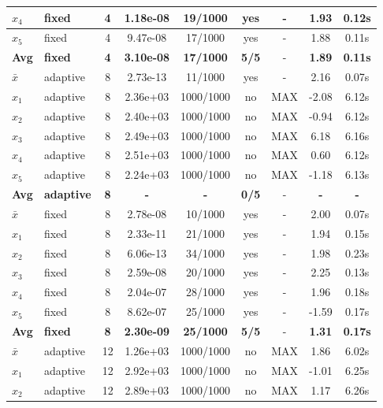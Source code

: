 \begin{longtable}{|l|l|c|c|c|c|c|c|c|}
\hline
$x_4$ & fixed & 4 & 1.18e-08 & 19/1000 & yes & - & 1.93 & 0.12s \\
\hline
$x_5$ & fixed & 4 & 9.47e-08 & 17/1000 & yes & - & 1.88 & 0.11s \\
\hline
\hline\hline
\textbf{Avg} & \textbf{fixed} & \textbf{4} & \textbf{3.10e-08} & \textbf{17/1000} & \textbf{5/5} & - & \textbf{1.89} & \textbf{0.11s} \\
\hline\hline
$\bar{x}$ & adaptive & 8 & 2.73e-13 & 11/1000 & yes & - & 2.16 & 0.07s \\
\hline
$x_1$ & adaptive & 8 & 2.36e+03 & 1000/1000 & no & MAX & -2.08 & 6.12s \\
\hline
$x_2$ & adaptive & 8 & 2.40e+03 & 1000/1000 & no & MAX & -0.94 & 6.12s \\
\hline
$x_3$ & adaptive & 8 & 2.49e+03 & 1000/1000 & no & MAX & 6.18 & 6.16s \\
\hline
$x_4$ & adaptive & 8 & 2.51e+03 & 1000/1000 & no & MAX & 0.60 & 6.12s \\
\hline
$x_5$ & adaptive & 8 & 2.24e+03 & 1000/1000 & no & MAX & -1.18 & 6.13s \\
\hline
\hline\hline
\textbf{Avg} & \textbf{adaptive} & \textbf{8} & \textbf{-} & \textbf{-} & \textbf{0/5} & - & \textbf{-} & \textbf{-} \\
\hline\hline
\hline
$\bar{x}$ & fixed & 8 & 2.78e-08 & 10/1000 & yes & - & 2.00 & 0.07s \\
\hline
$x_1$ & fixed & 8 & 2.33e-11 & 21/1000 & yes & - & 1.94 & 0.15s \\
\hline
$x_2$ & fixed & 8 & 6.06e-13 & 34/1000 & yes & - & 1.98 & 0.23s \\
\hline
$x_3$ & fixed & 8 & 2.59e-08 & 20/1000 & yes & - & 2.25 & 0.13s \\
\hline
$x_4$ & fixed & 8 & 2.04e-07 & 28/1000 & yes & - & 1.96 & 0.18s \\
\hline
$x_5$ & fixed & 8 & 8.62e-07 & 25/1000 & yes & - & -1.59 & 0.17s \\
\hline
\hline\hline
\textbf{Avg} & \textbf{fixed} & \textbf{8} & \textbf{2.30e-09} & \textbf{25/1000} & \textbf{5/5} & - & \textbf{1.31} & \textbf{0.17s} \\
\hline\hline
$\bar{x}$ & adaptive & 12 & 1.26e+03 & 1000/1000 & no & MAX & 1.86 & 6.02s \\
\hline
$x_1$ & adaptive & 12 & 2.92e+03 & 1000/1000 & no & MAX & -1.01 & 6.25s \\
\hline
$x_2$ & adaptive & 12 & 2.89e+03 & 1000/1000 & no & MAX & 1.17 & 6.26s \\

\end{longtable}
